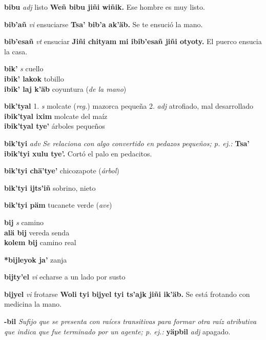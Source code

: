 \documentclass[10pt]{scrbook}
\newcommand{\entry}[1]{\textbf{#1}}
\newcommand{\onedefinition}[1]{#1.}
\newcommand{\nontranslationdef}[1]{\textit{#1}}
\newcommand{\partofspeech}[1]{\textit{#1}}
\newcommand{\spanishtranslation}[1]{#1}
\newcommand{\clarification}[1]{(\textit{#1})}
\newcommand{\cholexample}[1]{\textbf{#1}}
\newcommand{\exampletranslation}[1]{#1}
\newcommand{\secondaryentry}[1]{\\\textbf{#1}}
\newcommand{\secondtranslation}[1]{#1}
\begin{document}
\begin{multicols}{2}
\entry{bibu}
\partofspeech{adj}
\spanishtranslation{listo}
\cholexample{Weñ bibu jiñi wiñik.}
\exampletranslation{Ese hombre es muy listo.}

\entry{bib'añ}
\partofspeech{vi}
\spanishtranslation{ensuciarse}
\cholexample{Tsa' bib'a ak'äb.}
\exampletranslation{Se te ensució la mano.}

\entry{bib'esañ}
\partofspeech{vt}
\spanishtranslation{ensuciar}
\cholexample{Jiñi chityam mi ibib'esañ jiñi otyoty.}
\exampletranslation{El puerco ensucia la casa.}

\entry{bik'}
\partofspeech{s}
\spanishtranslation{cuello}
\secondaryentry{ibik' lakok}
\secondtranslation{tobillo}
\secondaryentry{ibik' laj k'äb}
\secondtranslation{coyuntura}
\clarification{de la mano}

\entry{bik'tyal}
\onedefinition{1}
\partofspeech{s}
\spanishtranslation{molcate}
\clarification{reg.}
\spanishtranslation{mazorca pequeña}
\onedefinition{2}
\partofspeech{adj}
\spanishtranslation{atrofiado, mal desarrollado}
\secondaryentry{ibik'tyal ixim}
\secondtranslation{molcate del maíz}
\secondaryentry{ibik'tyal tye'}
\secondtranslation{árboles pequeños}

\entry{bik'tyi}
\partofspeech{adv}
\nontranslationdef{Se relaciona con algo convertido en pedazos pequeños; p. ej.:}
\cholexample{Tsa' ibik'tyi xulu tye'.}
\exampletranslation{Cortó el palo en pedacitos.}

\entry{bik'tyi chä'tye'}
\spanishtranslation{chicozapote}
\clarification{árbol}

\entry{bik'tyi ijts'iñ}
\spanishtranslation{sobrino, nieto}

\entry{bik'tyi päm}
\spanishtranslation{tucanete verde}
\clarification{ave}

\entry{bij}
\partofspeech{s}
\spanishtranslation{camino}
\secondaryentry{alä bij}
\secondtranslation{vereda}
\secondtranslation{senda}
\secondaryentry{kolem bij}
\secondtranslation{camino real}

\entry{*bijleyok ja'}
\spanishtranslation{zanja}

\entry{bijty'el}
\partofspeech{vi}
\spanishtranslation{echarse a un lado por susto}

\entry{bijyel}
\partofspeech{vi}
\spanishtranslation{frotarse}
\cholexample{Woli tyi bijyel tyi ts'ajk jiñi ik'äb.}
\exampletranslation{Se está frotando con medicina la mano.}

\entry{-bil}
\nontranslationdef{Sufijo que se presenta con raíces transitivas para formar otra raíz atributiva que indica que fue terminado por un agente; p. ej.:}
\cholexample{yäpbil}
\partofspeech{adj}
\exampletranslation{apagado.}


\end{multicols}
\end{document}
